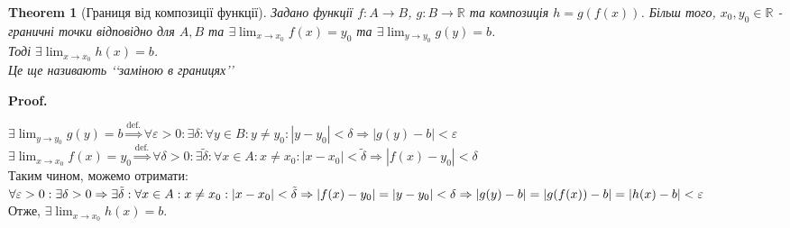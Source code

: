 \documentclass[a4paper, 14pt]{article}
\makeatletter
\def\huge{\displaystyle}
\def\qed{$\blacksquare$}
\theoremstyle{theoremdd}
\newtheorem{theorem}{Theorem}[subsection]
\theoremstyle{theoremdd}
\theoremstyle{theoremdd}
\theoremstyle{theoremdd}
\theoremstyle{theoremdd}
\theoremstyle{theoremdd}
\theoremstyle{theoremdd}
\theoremstyle{theoremdd}
\renewenvironment{proof}[1][Proof.\\]{\par
\pushQED{\hfill \qed}%
\normalfont \topsep6\p@\@plus6\p@\relax
\trivlist
\item\relax
{\bfseries
#1\@addpunct{.}}\hspace\labelsep\ignorespaces
}{%
\popQED\endtrivlist\@endpefalse
}
\makeatother
\begin{document}
\begin{theorem}[Границя від композиції функції]
Задано функції $f: A \to B$, $g: B \to \mathbb{R}$ та композиція $h = g(f(x))$. Більш того, $x_0, y_0 \in \mathbb{R}$ - граничні точки відповідно для $A,B$ та $\exists \huge \lim_{x \to x_0} f(x) = y_0$ та $\exists \huge \lim_{y \to y_0} g(y) = b$.\\
Тоді $\exists \huge \lim_{x \to x_0} h(x) = b$.\\
\textit{Це ще називають \lq\lq заміною в границях\rq\rq}
\end{theorem}

\begin{proof}
$\exists \huge \lim_{y \to y_0} g(y) = b \overset{\textrm{def.}}{\Rightarrow} \forall \varepsilon > 0: \exists \delta: \forall y \in B: y \neq y_0: |y-y_0|<\delta \Rightarrow |g(y)-b|<\varepsilon$\\
$\exists \huge \lim_{x \to x_0} f(x) = y_0 \overset{\textrm{def.}}{\Rightarrow} \forall \delta > 0: \exists \tilde{\delta}: \forall x \in A: x \neq x_0: |x-x_0|<\tilde{\delta} \Rightarrow |f(x)-y_0|<\delta$\\
Таким чином, можемо отримати: $\forall \varepsilon > 0: \exists \delta > 0 \Rightarrow \exists \tilde{\delta}: \forall x \in A: x \neq x_0: |x-x_0| < \tilde{\delta} \Rightarrow \\ |f(x)-y_0| = |y-y_0|<\delta \Rightarrow |g(y)-b|=|g(f(x))-b| = |h(x)-b|<\varepsilon$\\
Отже, $\exists \huge \lim_{x \to x_0} h(x) = b$.
\end{proof}
\end{document}
